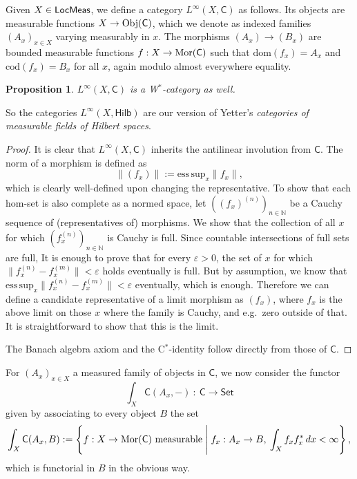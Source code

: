 \documentclass[reqno,T1]{amsproc}
\newcommand{\N}{\mathbb{N}}
\newcommand{\eps}{\varepsilon}
\newcommand{\dom}[1]{\mathrm{dom}(#1)} 		%
\newcommand{\cod}[1]{\mathrm{cod}(#1)} 		%
\newcommand{\esssup}{\mathrm{ess\, sup}} 	%
\newcommand{\cat}[1]{\mathsf{#1}}		%
\newcommand{\Set}{\mathsf{Set}}
\newcommand{\Hilb}{\mathsf{Hilb}} 		%
\theoremstyle{plain}
\newtheorem{prop}[thm]{Proposition}
\theoremstyle{remark}
\numberwithin{equation}{section}
\begin{document}
Given $X\in\LMeas$, we define a category $L^\infty(X,\cat{C})$ as follows. Its objects are measurable functions $X \to \Obj{\cat{C}}$, which we denote as indexed families $(A_x)_{x\in X}$ varying measurably in $x$. The morphisms $(A_x) \to (B_x)$ are bounded measurable functions $f : X \to \Mor{\cat{C}}$ such that $\dom{f_x} = A_x$ and $\cod{f_x} = B_x$ for all $x$, again modulo almost everywhere equality.

\begin{prop}
$L^\infty(X,\cat{C})$ is a W$^*$-category as well.
\end{prop}

So the categories $L^\infty(X,\Hilb)$ are our version of Yetter's \emph{categories of measurable fields of Hilbert spaces}.


\begin{proof}
It is clear that $L^\infty(X,\cat{C})$ inherits the antilinear involution from $\cat{C}$. The norm of a morphism is defined as
\[
	\| (f_x) \| := \esssup_x \| f_x \|,
\]
which is clearly well-defined upon changing the representative. To show that each hom-set is also complete as a normed space, let $( (f_x)^{(n)})_{n\in\N}$ be a Cauchy sequence of (representatives of) morphisms. We show that the collection of all $x$ for which $(f_x^{(n)})_{n\in\N}$ is Cauchy is full. Since countable intersections of full sets are full, It is enough to prove that for every $\eps > 0$, the set of $x$ for which $\| f_x^{(n)} - f_x^{(m)} \| < \eps$ holds eventually is full. But by assumption, we know that $\esssup_x \| f_x^{(n)} - f_x^{(m)} \| < \eps$ eventually, which is enough. Therefore we can define a candidate representative of a limit morphism as $(f_x)$, where $f_x$ is the above limit on those $x$ where the family is Cauchy, and e.g.~zero outside of that. It is straightforward to show that this is the limit.

The Banach algebra axiom and the C$^*$-identity follow directly from those of $\cat{C}$.

\end{proof}


For $(A_x)_{x\in X}$ a measured family of objects in $\cat{C}$, we now consider the functor
\[
	\int_X \cat{C}(A_x,-) \: : \: \cat{C}\to\Set
\]
given by associating to every object $B$ the set
\[
	\int_X \cat{C}(A_x , B) := \left\{ f : X\to\Mor{\cat{C}} \textrm{ measurable} \Biggm\vert f_x : A_x\to B,\: \int_X f_x f_x^* \,dx < \infty \right\},
\]
which is functorial in $B$ in the obvious way.
\end{document}
